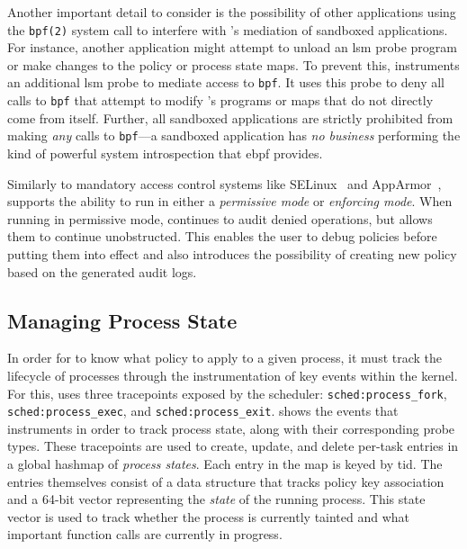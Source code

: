 Another important detail to consider is the possibility of other applications using the
\texttt{bpf(2)} system call to interfere with \bpfbox{}'s mediation of sandboxed
applications. For instance, another application might attempt to unload an \gls{lsm} probe
program or make changes to the policy or process state maps. To prevent this, \bpfbox{}
instruments an additional \gls{lsm} probe to mediate access to \texttt{bpf}. It uses this probe
to deny all calls to \texttt{bpf} that attempt to modify \bpfbox{}'s programs or maps that
do not directly come from \bpfbox{} itself. Further, all sandboxed applications are
strictly prohibited from making \textit{any} calls to \texttt{bpf}---a sandboxed
application has \textit{no business} performing the kind of powerful system introspection
that \gls{ebpf} provides.

Similarly to mandatory access control systems like SELinux~\cite{smalley2001_selinux} and
AppArmor~\cite{cowan2000_apparmor}, \bpfbox{} supports the ability to run in either a
\textit{permissive mode} or \textit{enforcing mode}.  When running in permissive mode,
\bpfbox{} continues to audit denied operations, but allows them to continue unobstructed.
This enables the user to debug policies before putting them into effect and also
introduces the possibility of creating new policy based on the generated audit logs.



\subsection{Managing Process State}%
\label{ss:bpfbox-state}

In order for \bpfbox{} to know what policy to apply to a given process, it must track the
lifecycle of processes through the instrumentation of key events within the kernel. For
this, \bpfbox{} uses three tracepoints exposed by the scheduler:
\texttt{sched:process\_fork}, \texttt{sched:process\_exec}, and
\texttt{sched:process\_exit}.  shows the events that \bpfbox{}
instruments in order to track process state, along with their corresponding probe types.
These tracepoints are used to create, update, and delete per-task entries in a global
hashmap of \textit{process states}.  Each entry in the map is keyed by \gls{tid}. The
entries themselves consist of a data structure that tracks policy key association and
a 64-bit vector representing the \textit{state} of the running process.  This state vector
is used to track whether the process is currently tainted and what important function
calls are currently in progress.

